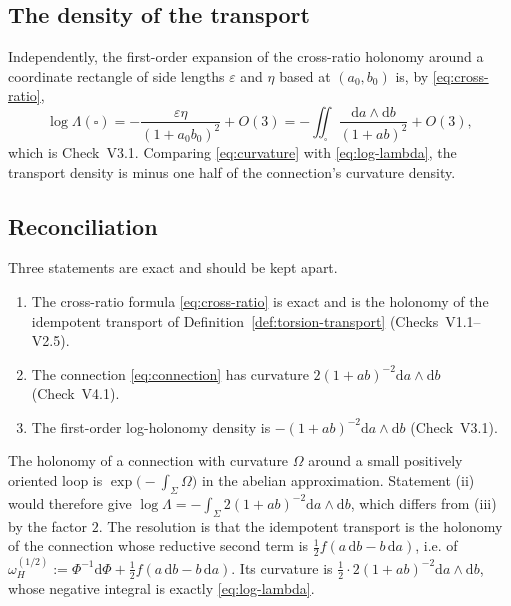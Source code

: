 \subsection{The density of the transport}

Independently, the first-order expansion of the cross-ratio holonomy around a
coordinate rectangle of side lengths $\varepsilon$ and $\eta$ based at $(a_0,b_0)$
is, by \eqref{eq:cross-ratio},
\begin{equation}\label{eq:log-lambda}
  \log\Lambda(\square)
  =-\frac{\varepsilon\eta}{(1+a_0b_0)^{2}}+O(3)
  =-\iint_{\square}\frac{\mathrm da\wedge\mathrm db}{(1+ab)^{2}}+O(3),
\end{equation}
which is Check~V3.1.  Comparing \eqref{eq:curvature} with \eqref{eq:log-lambda},
the transport density is minus one half of the connection's curvature density.

\subsection{Reconciliation}

Three statements are exact and should be kept apart.

\begin{enumerate}[label=(\roman*)]
  \item The cross-ratio formula \eqref{eq:cross-ratio} is exact and is the
  holonomy of the idempotent transport of Definition~\ref{def:torsion-transport}
  (Checks~V1.1--V2.5).
  \item The connection \eqref{eq:connection} has curvature
  $2(1+ab)^{-2}\mathrm da\wedge\mathrm db$ (Check~V4.1).
  \item The first-order log-holonomy density is
  $-(1+ab)^{-2}\mathrm da\wedge\mathrm db$ (Check~V3.1).
\end{enumerate}

The holonomy of a connection with curvature $\Omega$ around a small positively
oriented loop is $\exp\bigl(-\int_\Sigma\Omega\bigr)$ in the abelian
approximation.  Statement (ii) would therefore give
$\log\Lambda=-\int_\Sigma 2(1+ab)^{-2}\mathrm da\wedge\mathrm db$, which differs
from (iii) by the factor $2$.  The resolution is that the idempotent transport is
the holonomy of the connection whose reductive second term is
$\tfrac12 f(a\,\mathrm db-b\,\mathrm da)$, i.e. of
$\omega_H^{(1/2)}:=\Phi^{-1}\mathrm d\Phi+\tfrac12 f(a\,\mathrm db-b\,\mathrm da)$.
Its curvature is $\tfrac12\cdot2(1+ab)^{-2}\mathrm da\wedge\mathrm db$, whose
negative integral is exactly \eqref{eq:log-lambda}.

